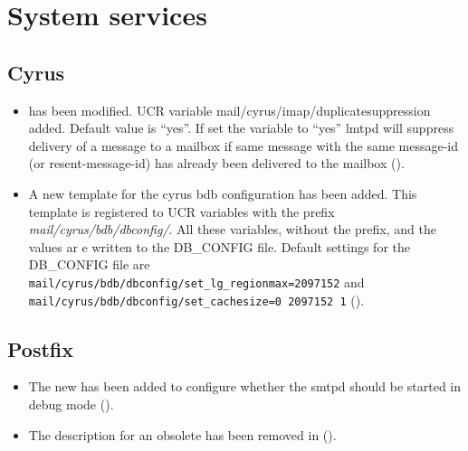 \section{System services}



\subsection{Cyrus}
\begin{itemize}

\item {} has been modified. UCR variable
mail/cyrus/imap/duplicatesuppression added. Default value is ``yes''. If set
the variable to ``yes'' lmtpd will suppress delivery of a message to a mailbox
if same message with the same message-id (or resent-message-id) has already
been delivered to the mailbox ().

\item A new \ucsUCR{} template  for the cyrus
bdb configuration has been added. This template is registered to
UCR variables with the prefix \emph{mail/cyrus/bdb/dbconfig/}. All
these variables, without the prefix, and the values ar e written to the
DB\_CONFIG file. Default settings for the DB\_CONFIG file are
\texttt{mail/cyrus/bdb/dbconfig/set\_lg\_regionmax=2097152} and
\texttt{mail/cyrus/bdb/dbconfig/set\_cachesize=0 2097152 1} ().

\end{itemize}

\subsection{Postfix}
\begin{itemize}

\item The new  has been added to configure
whether the smtpd should be started in debug mode ().

\item The description for an obsolete \ucsUCRV{} has been removed in
 ().

\end{itemize}

